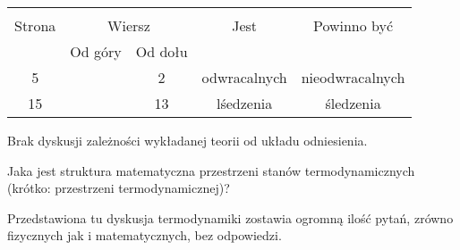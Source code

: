\documentclass[a4paper,11pt]{article}
\begin{document}
\begin{center}

  \begin{tabular}{|c|c|c|c|c|}
    \hline
    & \multicolumn{2}{c|}{} & & \\
    Strona & \multicolumn{2}{c|}{Wiersz} & Jest
                              & Powinno być \\ \cline{2-3}
    & Od góry & Od dołu & & \\
    \hline
    5   & &  2 & odwracalnych & nieodwracalnych \\
    15  & & 13 & lśedzenia & śledzenia \\
    \hline
  \end{tabular}

\end{center}

\vspace{\spaceTwo}














Brak dyskusji zależności wykładanej teorii od układu odniesienia.

\vspace{\spaceFour}



Jaka jest struktura matematyczna przestrzeni stanów termodynamicznych (krótko: przestrzeni termodynamicznej)?

\vspace{\spaceFour}



Przedstawiona tu dyskusja termodynamiki zostawia ogromną ilość pytań, zrówno fizycznych jak i matematycznych, bez odpowiedzi.
\end{document}

